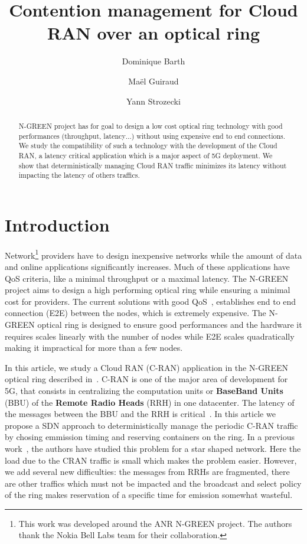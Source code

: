 \documentclass[]{algotel}
\title{Contention management for Cloud RAN over an optical ring}
\author{Dominique Barth\addressmark{1}
  \and Ma\"el Guiraud\addressmark{1}
   \and Yann Strozecki\addressmark{1}
  }
\begin{document}
\maketitle


\begin{abstract}
N-GREEN project has for goal to design a low cost optical ring technology with good performances (throughput, latency$\dots$) without using expensive end to end connections. We study the compatibility of such a technology with the development of the Cloud RAN, a latency critical application which is a major aspect of 5G deployment. We show that deterministically managing Cloud RAN traffic minimizes its latency without impacting the latency of others traffics. 
\end{abstract}


\section{Introduction}

Network\footnote{This work was developed around the ANR N-GREEN project. The authors thank the Nokia Bell Labs team for their collaboration.} providers have to design inexpensive networks while the amount of data and online applications significantly increases. Much of these applications have QoS criteria, like a minimal throughput or a maximal latency. The N-GREEN project aims to design a high performing optical ring while ensuring a minimal cost for providers. The current solutions with good QoS~\cite{pizzinat2015things}, establishes end to end connection (E2E) between the nodes, which is extremely expensive. The N-GREEN optical ring is designed to ensure good performances and the hardware it requires scales linearly with the number of nodes while E2E scales quadratically making it impractical for more than a few nodes.

In this article, we study a Cloud RAN (C-RAN) application in the N-GREEN optical ring described in~\cite{ngreenarchitecture}. C-RAN is one of the major area of development for 5G, that consists in centralizing the computation units or {\bf BaseBand Units} (BBU) of the {\bf Remote Radio Heads} (RRH) in one datacenter. The latency of the messages between the BBU and the RRH is critical~\cite{bouguen2012lte,3gpp5g}. In this article we propose a SDN approach to deterministically manage the periodic C-RAN traffic by chosing emmission timing and reserving containers on the ring. In a previous work~\cite{dominique2018deterministic}, the authors have studied this problem for a star shaped network. Here the load due to the CRAN traffic is small which makes the problem easier. However, we add several new difficulties: the messages from RRHs are fragmented, there are other traffics which must not be impacted and the broadcast and select policy of the ring makes reservation of a specific time for emission somewhat wasteful. 
\end{document}

